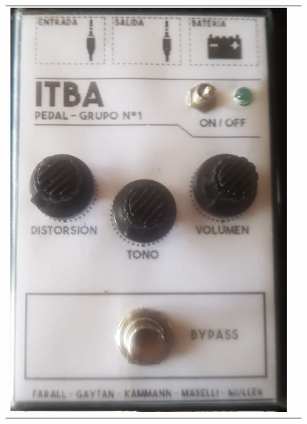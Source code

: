 \begin{figure}[H]
\begin{tabular}{c c}
        \includegraphics[scale=0.45]{../EJ5/Recursos/hecho_frente.jpeg} &

\end{tabular}
\end{figure}
